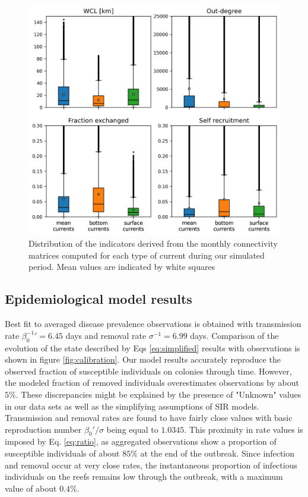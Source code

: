 \documentclass[utf8]{frontiersSCNS}
\begin{document}
\begin{figure}
    \centering
    \includegraphics[width=.8\textwidth]{figures/connect_paper.png}
    \caption{Distribution of the indicators derived from the monthly connectivity matrices computed for each type of current during our simulated period. Mean values are indicated by white squares}
    \label{fig:connect}
\end{figure}

\subsection{Epidemiological model results}

Best fit to averaged disease prevalence observations is obtained with transmission rate $\beta_0^{-1}'=6.45$ days and removal rate $\sigma^{-1}=6.99$ days. Comparison of the evolution of the state described by Eqs \ref{eq:simplified} results with observations is shown in figure \ref{fig:calibration}. Our model results accurately reproduce the observed fraction of susceptible individuals on colonies through time. However, the modeled fraction of removed individuals overestimates observations by about $5\%$. These discrepancies might be explained by the presence of "Unknown" values in our data sets as well as the simplifying assumptions of SIR models. Transmission and removal rates are found to have fairly close values with basic reproduction number $\beta_0'/\sigma$ being equal to $1.0345$. This proximity in rate values is imposed by Eq. \ref{eq:ratio}, as aggregated observations show a proportion of susceptible individuals of about $85\%$ at the end of the outbreak. Since infection and removal occur at very close rates, the instantaneous proportion of infectious individuals on the reefs remains low through the outbreak, with a maximum value of about $0.4\%$.
\end{document}
